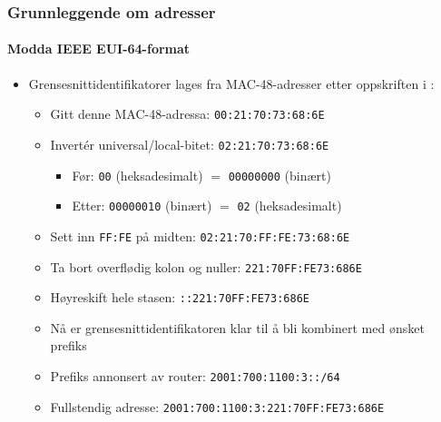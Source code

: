 \begin{frame}%
  \frametitle{Grunnleggende om adresser}
  \framesubtitle{Modda IEEE EUI-64-format}
  \begin{itemize}[<+->]
  \item Grensesnittidentifikatorer lages fra MAC-48-adresser etter
    oppskriften i :
    \begin{itemize}[<+->]
    \item Gitt denne MAC-48-adressa: \texttt{00:21:70:73:68:6E}
    \item Invertér universal/local-bitet: \texttt{0\alert{2}:21:70:73:68:6E}
      \begin{itemize}[<+->]
      \item Før: \texttt{0\alert{0}} (heksadesimalt) \({}={}\) \texttt{000000\alert{0}0} (binært)
      \item Etter: \texttt{000000\alert{1}0} (binært) \({}={}\) \texttt{0\alert{2}} (heksadesimalt)
      \end{itemize}
    \item Sett inn \texttt{FF:FE} på midten: \texttt{02:21:70:\alert{FF:FE}:73:68:6E}
    \item Ta bort overflødig kolon og nuller: \texttt{221:70FF:FE73:686E}
    \item Høyreskift hele stasen: \texttt{::221:70FF:FE73:686E}
    \item Nå er grensesnittidentifikatoren klar til å bli kombinert med ønsket prefiks
    \item Prefiks annonsert av router: \texttt{2001:700:1100:3::/64}
    \item Fullstendig adresse: \texttt{2001:700:1100:3:221:70FF:FE73:686E}
    \end{itemize}
  \end{itemize}
\end{frame}

